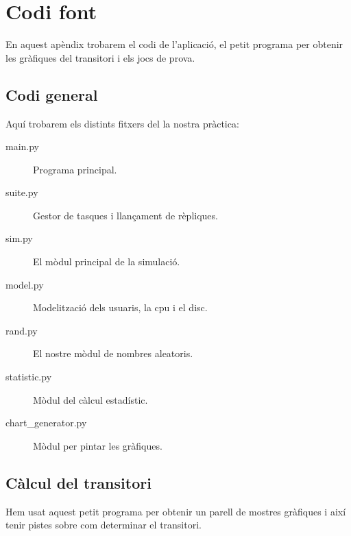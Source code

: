 \newpage

\addtolength{\hoffset}{-2cm}

\section{Codi font}

En aquest apèndix trobarem el codi de l'aplicació, el petit programa per
obtenir les gràfiques del transitori i els jocs de prova.

\subsection{Codi general}

Aquí trobarem els distints fitxers del la nostra pràctica:

\begin{description}

  \item[main.py] Programa principal.

  \item[suite.py] Gestor de tasques i llançament de rèpliques.

  \item[sim.py] El mòdul principal de la simulació.

  \item[model.py] Modelització dels usuaris, la cpu i el disc.

  \item[rand.py] El nostre mòdul de nombres aleatoris.

  \item[statistic.py] Mòdul del càlcul estadístic.

  \item[chart\_generator.py] Mòdul per pintar les gràfiques.

\end{description}



\newpage

\subsection{Càlcul del transitori}

Hem usat aquest petit programa per obtenir un parell de mostres gràfiques i
així tenir pistes sobre com determinar el transitori.

